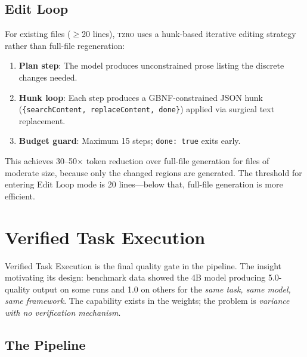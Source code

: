 \documentclass{article}
\begin{document}
\subsection{Edit Loop}

For existing files ($\geq$20 lines), \textsc{tzro} uses a hunk-based iterative editing strategy rather than full-file regeneration:

\begin{enumerate}[leftmargin=*]
\item \textbf{Plan step}: The model produces unconstrained prose listing the discrete changes needed.
\item \textbf{Hunk loop}: Each step produces a GBNF-constrained JSON hunk (\texttt{\{searchContent, replaceContent, done\}}) applied via surgical text replacement.
\item \textbf{Budget guard}: Maximum 15 steps; \texttt{done: true} exits early.
\end{enumerate}

This achieves 30--50$\times$ token reduction over full-file generation for files of moderate size, because only the changed regions are generated.
The threshold for entering Edit Loop mode is 20 lines---below that, full-file generation is more efficient.

\section{Verified Task Execution}
\label{sec:verified_execution}

Verified Task Execution is the final quality gate in the pipeline.
The insight motivating its design: benchmark data showed the 4B model producing 5.0-quality output on some runs and 1.0 on others for the \emph{same task, same model, same framework}.
The capability exists in the weights; the problem is \emph{variance with no verification mechanism}.

\subsection{The Pipeline}
\end{document}
